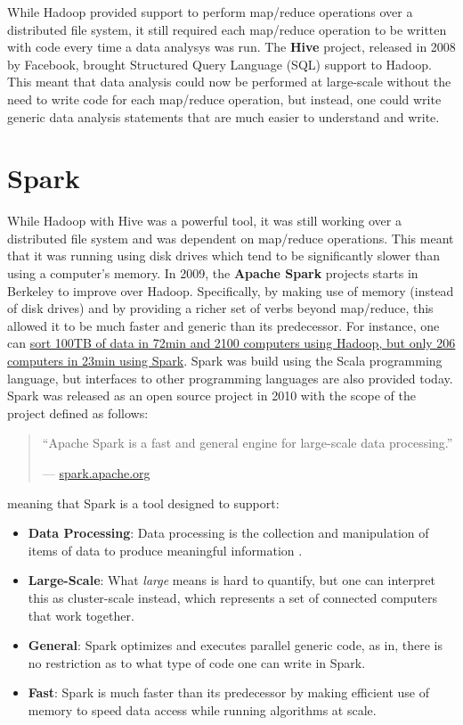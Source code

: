 \documentclass[]{book}
\providecommand{\tightlist}{%
  \setlength{\itemsep}{0pt}\setlength{\parskip}{0pt}}
\theoremstyle{definition}
\theoremstyle{definition}
\theoremstyle{definition}
\theoremstyle{remark}
\begin{document}
While Hadoop provided support to perform map/reduce operations over a
distributed file system, it still required each map/reduce operation to
be written with code every time a data analysys was run. The
\textbf{Hive} project, released in 2008 by Facebook, brought Structured
Query Language (SQL) support to Hadoop. This meant that data analysis
could now be performed at large-scale without the need to write code for
each map/reduce operation, but instead, one could write generic data
analysis statements that are much easier to understand and write.

\hypertarget{spark}{%
\section{Spark}\label{spark}}

While Hadoop with Hive was a powerful tool, it was still working over a
distributed file system and was dependent on map/reduce operations. This
meant that it was running using disk drives which tend to be
significantly slower than using a computer's memory. In 2009, the
\textbf{Apache Spark} projects starts in Berkeley to improve over
Hadoop. Specifically, by making use of memory (instead of disk drives)
and by providing a richer set of verbs beyond map/reduce, this allowed
it to be much faster and generic than its predecessor. For instance, one
can
\href{https://databricks.com/blog/2014/11/05/spark-officially-sets-a-new-record-in-large-scale-sorting.html}{sort
100TB of data in 72min and 2100 computers using Hadoop, but only 206
computers in 23min using Spark}. Spark was build using the Scala
programming language, but interfaces to other programming languages are
also provided today. Spark was released as an open source project in
2010 with the scope of the project defined as follows:

\begin{quote}
``Apache Spark is a fast and general engine for large-scale data
processing.''

--- \href{http://spark.apache.org/}{spark.apache.org}
\end{quote}

meaning that Spark is a tool designed to support:

\begin{itemize}
\tightlist
\item
  \textbf{Data Processing}: Data processing is the collection and
  manipulation of items of data to produce meaningful information
  \citep{data-processing}.
\item
  \textbf{Large-Scale}: What \emph{large} means is hard to quantify, but
  one can interpret this as cluster-scale instead, which represents a
  set of connected computers that work together.
\item
  \textbf{General}: Spark optimizes and executes parallel generic code,
  as in, there is no restriction as to what type of code one can write
  in Spark.
\item
  \textbf{Fast}: Spark is much faster than its predecessor by making
  efficient use of memory to speed data access while running algorithms
  at scale.
\end{itemize}
\end{document}
